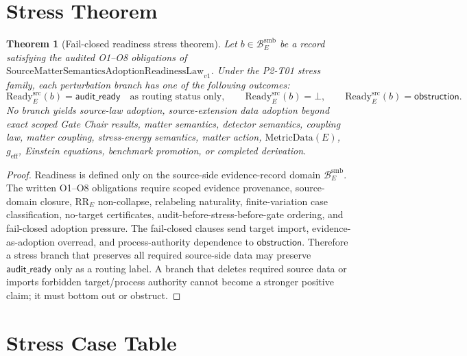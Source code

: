 \documentclass[11pt]{article}
\newcommand{\SMSAR}{\mathrm{SourceMatterSemanticsAdoptionReadinessLaw}_{v1}}
\newcommand{\BridgeDom}{\mathcal B^{\mathrm{smb}}_E}
\newcommand{\Ready}{\mathrm{Ready}^{\mathrm{src}}_E}
\newcommand{\AuditReady}{\mathsf{audit\_ready}}
\newcommand{\Obstruction}{\mathsf{obstruction}}
\newcommand{\Bottom}{\bot}
\newcommand{\MetricData}{\mathrm{MetricData}}
\newcommand{\geff}{g_{\mathrm{eff}}}
\newtheorem{theorem}{Theorem}
\begin{document}
\section{Stress Theorem}

\begin{theorem}[Fail-closed readiness stress theorem]
Let \(b\in\BridgeDom\) be a record satisfying the audited O1--O8 obligations
of \(\SMSAR\). Under the P2-T01 stress family, each perturbation branch has
one of the following outcomes:
\[
  \Ready(b)=\AuditReady\quad\text{as routing status only},
  \qquad
  \Ready(b)=\Bottom,
  \qquad
  \Ready(b)=\Obstruction.
\]
No branch yields source-law adoption, source-extension data adoption beyond
exact scoped Gate Chair results, matter semantics, detector semantics,
coupling law, matter coupling, stress-energy semantics, matter action,
\(\MetricData(E)\), \(\geff\), Einstein equations, benchmark promotion, or
completed derivation.
\end{theorem}

\begin{proof}
Readiness is defined only on the source-side evidence-record domain
\(\BridgeDom\). The written O1--O8 obligations require scoped evidence
provenance, source-domain closure, \(\mathrm{RR}_E\) non-collapse, relabeling
naturality, finite-variation case classification, no-target certificates,
audit-before-stress-before-gate ordering, and fail-closed adoption pressure.
The fail-closed clauses send target import, evidence-as-adoption overread, and
process-authority dependence to \(\Obstruction\). Therefore a stress branch
that preserves all required source-side data may preserve \(\AuditReady\) only
as a routing label. A branch that deletes required source data or imports
forbidden target/process authority cannot become a stronger positive claim; it
must bottom out or obstruct.
\end{proof}

\section{Stress Case Table}
\end{document}
